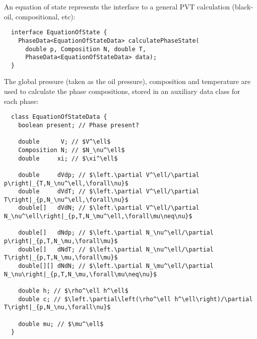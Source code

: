 

An equation of state represents the interface to a general PVT
calculation (black-oil, compositional, etc):

\begin{lstlisting}
  interface EquationOfState {
    PhaseData<EquationOfStateData> calculatePhaseState(
      double p, Composition N, double T,
      PhaseData<EquationOfStateData> data);
  }
\end{lstlisting}
The global pressure (taken as the oil pressure), composition and
temperature are used to calculate the phase compositions, stored in an
auxiliary data class for each phase:

\begin{lstlisting}
  class EquationOfStateData {
    boolean present; // Phase present?

    double      V; // $V^\ell$
    Composition N; // $N_\nu^\ell$
    double     xi; // $\xi^\ell$

    double     dVdp; // $\left.\partial V^\ell/\partial p\right|_{T,N_\nu^\ell,\forall\nu}$
    double     dVdT; // $\left.\partial V^\ell/\partial T\right|_{p,N_\nu^\ell,\forall\nu}$
    double[]   dVdN; // $\left.\partial V^\ell/\partial N_\nu^\ell\right|_{p,T,N_\mu^\ell,\forall\mu\neq\nu}$

    double[]   dNdp; // $\left.\partial N_\nu^\ell/\partial p\right|_{p,T,N_\mu,\forall\mu}$
    double[]   dNdT; // $\left.\partial N_\nu^\ell/\partial T\right|_{p,T,N_\mu,\forall\mu}$
    double[][] dNdN; // $\left.\partial N_\mu^\ell/\partial N_\nu\right|_{p,T,N_\mu,\forall\mu\neq\nu}$

    double h; // $\rho^\ell h^\ell$
    double c; // $\left.\partial\left(\rho^\ell h^\ell\right)/\partial T\right|_{p,N_\nu,\forall\nu}$

    double mu; // $\mu^\ell$
  }
\end{lstlisting}





